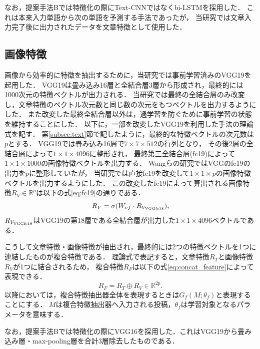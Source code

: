 なお，提案手法Bでは特徴化の際にText-CNNではなくbi-LSTMを採用した．
これは本来入力単語から次の単語を予測する手法であったが，
当研究では文章入力完了後に出力されたデータを文章特徴として使用した．
%
\subsection{画像特徴}
画像から効率的に特徴を抽出するために，当研究では事前学習済みのVGG19\cite{DBLP:journals/corr/SimonyanZ14a}を起用した．
VGG19は畳み込み16層と全結合層3層から形成され，最終的には1000次元の特徴ベクトルが出力される．
当研究では最終の全結合層のみ改変し，文章特徴のベクトル次元数と同じ数の次元をもつベクトルを出力するようにした．
また改変した最終全結合層以外は，過学習を防ぐために事前学習の状態を維持することにした．
以下に，一部を改変したVGG19を利用した手法の理論式を記す．
第\ref{subsec:text}節で記したように，最終的な特徴ベクトルの次元数は$p$とする．
VGG19では畳み込み16層で$7 \times 7 \times 512$の行列となり，
その後2層の全結合層によって$1 \times 1 \times 4096$に整形され，
最終第三全結合層(fc19)によって$1 \times 1 \times 1000$の画像特徴ベクトルを出力する．
Wangらの研究\cite{Wang:2018:EEA:3219819.3219903}ではVGGのfc19の出力を$p$に整形していたが，
当研究では直接fc19を改変して$1 \times 1 \times p$の画像特徴ベクトルを出力するようにした．
この改変したfc19によって算出される画像特徴$R_V \in \mathbb{R}^p$は以下の式\ref{eq:fc19}の通りである．
\begin{equation}
    \label{eq:fc19}
    R_V = \sigma(W_{vf} \cdot R_{V_{\rm VGGfc18}}),
\end{equation}
$R_{V_{\rm VGGfc18}}$はVGG19の第18層である全結合層が出力した$1 \times 1 \times 4096$ベクトルである．

こうして文章特徴・画像特徴が抽出され，最終的には2つの特徴ベクトルを1つに連結したものが複合特徴である．
理論式で表記すると，文章特徴$R_T$と画像特徴$R_V$が1つに結合されるため，
複合特徴$R_F$は以下の式\ref{eq:concat_feature}によって表現できる．
\begin{equation}
    \label{eq:concat_feature}
    R_F = R_T \oplus R_V \in \mathbb{R}^{2p}.
\end{equation}
以降においては，複合特徴抽出器全体を表現するときは$G_f(M; \theta_f)$と表現することにする．
$M$は複合特徴抽出器へ入力される投稿，$\theta_f$は学習対象となるパラメータを意味する．

なお，提案手法Bでは特徴化の際にVGG16を採用した．これはVGG19から畳み込み層・max-pooling層を合計3層除去したものである．
%
